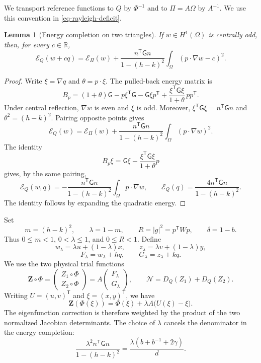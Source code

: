 \documentclass[11pt]{amsart}
\newtheorem{lemma}[theorem]{Lemma}
\theoremstyle{remark}\newtheorem{remark}[theorem]{Remark}
\numberwithin{equation}{section}
\begin{document}
We transport reference functions to \(Q\) by \(\Phi^{-1}\)
and to \(\Pi=A\Omega\) by \(A^{-1}\).
We use this convention in \eqref{eq-rayleigh-deficit}.

\begin{lemma}[Energy completion on two triangles]
\label{lem-new-tent-energy}
If \(w\in H^1(\Omega)\) is centrally odd, then, for every \(c\in\mathbb R\),
\[
\mathcal E_Q(w+cq)=\mathcal E_\Pi(w)+
\frac{n^{\mathsf T}\mathsf Gn}{1-(h-k)^2}
\int_\Omega(p\cdot\nabla w-c)^2.
\]
\end{lemma}

\begin{proof}
Write \(\xi=\nabla q\) and \(\theta=p\cdot\xi\).
The pulled-back energy matrix is
\[
B_p=(1+\theta)\mathsf G-p\xi^{\mathsf T}\mathsf G
-\mathsf G\xi p^{\mathsf T}
+\frac{\xi^{\mathsf T}\mathsf G\xi}{1+\theta}\,pp^{\mathsf T}.
\]
Under central reflection, \(\nabla w\) is even and \(\xi\) is odd.
Moreover, \(\xi^{\mathsf T}\mathsf G\xi=n^{\mathsf T}\mathsf Gn\)
and \(\theta^2=(h-k)^2\).
Pairing opposite points gives
\[
\mathcal E_Q(w)=\mathcal E_\Pi(w)+
\frac{n^{\mathsf T}\mathsf Gn}{1-(h-k)^2}
\int_\Omega(p\cdot\nabla w)^2.
\]
The identity
\[
B_p\xi=\mathsf G\xi-
\frac{\xi^{\mathsf T}\mathsf G\xi}{1+\theta}p
\]
gives, by the same pairing,
\[
\mathcal E_Q(w,q)=-
\frac{n^{\mathsf T}\mathsf Gn}{1-(h-k)^2}
\int_\Omega p\cdot\nabla w,\qquad
\mathcal E_Q(q)=
\frac{4n^{\mathsf T}\mathsf Gn}{1-(h-k)^2}.
\]
The identity follows by expanding the quadratic energy.
\end{proof}

Set
\[
m=(h-k)^2,\qquad \lambda=1-m,\qquad
R=|g|^2=p^{\mathsf T}Wp,\qquad \delta=1-b.
\]
Thus \(0\le m<1\), \(0<\lambda\le1\), and \(0\le R<1\).
Define
\[
w_\lambda=\lambda u+(1-\lambda)x,\qquad
z_\lambda=\lambda v+(1-\lambda)y,
\]
\[
F_\lambda=w_\lambda+hq,\qquad
G_\lambda=z_\lambda+kq.
\]
We use the two physical trial functions
\[
\mathbf Z\circ\Phi=\begin{pmatrix}Z_1\circ\Phi\\ Z_2\circ\Phi\end{pmatrix}
=A\begin{pmatrix}F_\lambda\\ G_\lambda\end{pmatrix},
\qquad
\mathcal N=D_Q(Z_1)+D_Q(Z_2).
\]
Writing $U=(u,v)^{\mathsf T}$ and $\xi=(x,y)^{\mathsf T}$, we have
\[
\mathbf Z(\Phi(\xi))=\Phi(\xi)+\lambda A\bigl(U(\xi)-\xi\bigr).
\]
The eigenfunction correction is therefore weighted by the product of the
two normalized Jacobian determinants.
The choice of \(\lambda\) cancels the denominator in the energy
completion:
\[
\frac{\lambda^2 n^{\mathsf T}\mathsf Gn}{1-(h-k)^2}
=\frac{\lambda(b+b^{-1}+2\gamma)}d.
\]
\end{document}
